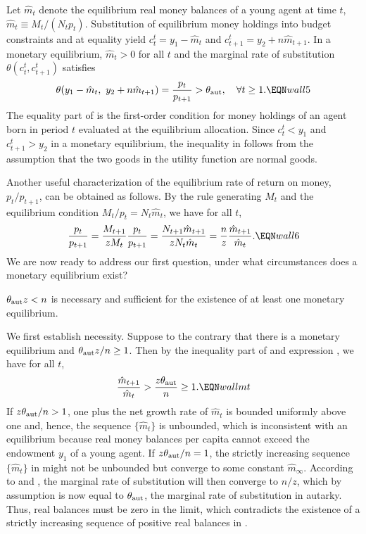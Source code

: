 Let $\hat m_t$ denote the equilibrium real money
balances of a young agent at time $t$,
$\hat m_t \equiv M_t / (N_t p_t)$. Substitution of equilibrium money
holdings into budget constraints  and  at equality
yield $c^t_t= y_1 - \hat m_t$ and $c^t_{t+1}=y_2 + n \hat m_{t+1}$.
In a monetary equilibrium, $\hat m_t > 0$ for all $t$ and the
marginal rate of substitution $\theta(c^t_t,c^t_{t+1})$ satisfies
$$
\theta(y_1- \hat m_t, \ y_2 + n \hat m_{t+1}) = { p_t \over p_{t+1} }
> \theta_{\rm aut},   \quad  \forall t \geq 1 .            \EQN wall5
$$
The equality part of  is the first-order condition for money
holdings of an agent born in period $t$ evaluated at the equilibrium
allocation. Since $c^t_t <y_1$ and $c^t_{t+1} > y_2$ in a monetary
equilibrium, the inequality in
 follows from the assumption that the two goods in the
utility function are normal goods.

Another useful characterization of the equilibrium rate of return on
money, $p_t/p_{t+1}$, can be obtained as follows.
By the rule generating $M_t$ and the equilibrium condition
$M_t/p_t=N_t \hat m_t$, we have for all $t$,
$$
{p_t \over p_{t+1}} = {M_{t+1} \over z M_t} {p_t \over p_{t+1}}
= {N_{t+1} \hat m_{t+1} \over z N_t \hat m_t}
= {n \over z} {\hat m_{t+1} \over \hat m_t}.                 \EQN wall6
$$
We are now ready to address our first question, under what circumstances
does a monetary equilibrium exist?

\medskip
{}  $\theta_{\rm aut} z < n$ is necessary
and sufficient for the existence of at least one monetary equilibrium.
\medskip

We first establish necessity. Suppose to the contrary that there is
a monetary equilibrium and $\theta_{\rm aut} z / n \geq 1$. Then 
by the inequality part of  and expression ,
we have for all $t$,
$$
{\hat m_{t+1} \over \hat m_t}  > { z \theta_{\rm aut} \over n} \geq 1. \EQN wallmt
$$
If $z \theta_{\rm aut} / n > 1$, one plus the net growth rate of $\hat m_t$ is
bounded uniformly above one and, hence,
the sequence $\{\hat m_t\}$ is unbounded, which is
inconsistent with an equilibrium because real money balances per capita
cannot exceed the endowment $y_1$ of a young agent.
If $z \theta_{\rm aut} / n = 1$, the strictly increasing sequence
$\{\hat m_t\}$ in  might not be unbounded but converge
to some constant $\hat m_\infty$.
According to  and , the marginal rate
of substitution will then converge to $n/z$, which by assumption is now
equal to $\theta_{\rm aut}$, the marginal rate of substitution in
autarky. Thus, real balances must be zero in the limit, which contradicts
the existence of a strictly increasing sequence of positive real balances
in .

